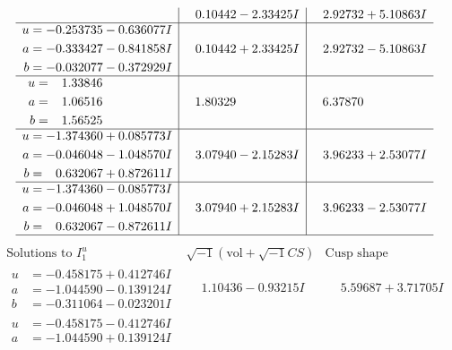 \documentclass[1p]{elsarticle_modified}
\theoremstyle{definition}
\newcommand{\I}{\sqrt{-1}}
\begin{document}
$$\begin{array}{c|c|c}
 & \phantom{-}0.10442 - 2.33425 I & \phantom{-}2.92732 + 5.10863 I \\ \hline\begin{aligned}
u &= -0.253735 - 0.636077 I \\
a &= -0.333427 - 0.841858 I \\
b &= -0.032077 - 0.372929 I\end{aligned}
 & \phantom{-}0.10442 + 2.33425 I & \phantom{-}2.92732 - 5.10863 I \\ \hline\begin{aligned}
u &= \phantom{-}1.33846\phantom{ +0.000000I} \\
a &= \phantom{-}1.06516\phantom{ +0.000000I} \\
b &= \phantom{-}1.56525\phantom{ +0.000000I}\end{aligned}
 & \phantom{-}1.80329\phantom{ +0.000000I} & \phantom{-}6.37870\phantom{ +0.000000I} \\ \hline\begin{aligned}
u &= -1.374360 + 0.085773 I \\
a &= -0.046048 - 1.048570 I \\
b &= \phantom{-}0.632067 + 0.872611 I\end{aligned}
 & \phantom{-}3.07940 - 2.15283 I & \phantom{-}3.96233 + 2.53077 I \\ \hline\begin{aligned}
u &= -1.374360 - 0.085773 I \\
a &= -0.046048 + 1.048570 I \\
b &= \phantom{-}0.632067 - 0.872611 I\end{aligned}
 & \phantom{-}3.07940 + 2.15283 I & \phantom{-}3.96233 - 2.53077 I\\
 \hline 
 \end{array}$$\newpage$$\begin{array}{c|c|c}  
\text{Solutions to }I^u_{1}& \I (\text{vol} + \sqrt{-1}CS) & \text{Cusp shape}\\
 \hline 
\begin{aligned}
u &= -0.458175 + 0.412746 I \\
a &= -1.044590 - 0.139124 I \\
b &= -0.311064 - 0.023201 I\end{aligned}
 & \phantom{-}1.10436 - 0.93215 I & \phantom{-}5.59687 + 3.71705 I \\ \hline\begin{aligned}
u &= -0.458175 - 0.412746 I \\
a &= -1.044590 + 0.139124 I \\

\end{aligned}
\end{array}$$
\end{document}
